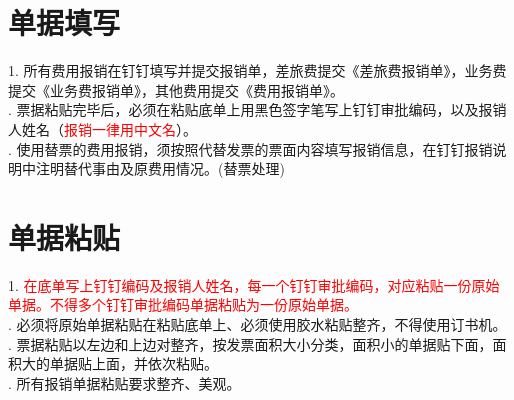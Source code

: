 \documentclass[]{article}
\begin{document}
\section{单据填写}                                                                                                                                                                                                                                                                                                                                         
1.	所有费用报销在钉钉填写并提交报销单，差旅费提交《差旅费报销单》，业务费提交《业务费报销单》，其他费用提交《费用报销单》。\\.	票据粘贴完毕后，必须在粘贴底单上用黑色签字笔写上钉钉审批编码，以及报销人姓名（\textcolor{red}{报销一律用中文名}）。\\.	使用替票的费用报销，须按照代替发票的票面内容填写报销信息，在钉钉报销说明中注明替代事由及原费用情况。(替票处理)

\section{单据粘贴}
1.	\textcolor{red}{在底单写上钉钉编码及报销人姓名，每一个钉钉审批编码，对应粘贴一份原始单据。不得多个钉钉审批编码单据粘贴为一份原始单据。}\\.	必须将原始单据粘贴在粘贴底单上、必须使用胶水粘贴整齐，不得使用订书机。 \\.	票据粘贴以左边和上边对整齐，按发票面积大小分类，面积小的单据贴下面，面积大的单据贴上面，并依次粘贴。\\.	所有报销单据粘贴要求整齐、美观。 
\end{document}
